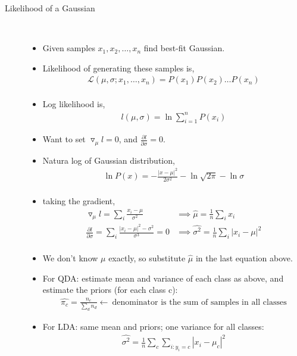 \documentclass[10pt]{article}
\begin{document}
\begin{description}
	\item[Likelihood of a Gaussian]
		\
		\begin{itemize}
			\item Given samples $x_{1}, x_{2}, \dots, x_{n}$ find best-fit Gaussian.
			\item Likelihood of generating these samples is,
				\begin{align*}
					\mathcal{L}(\mu, \sigma;x_{1}, \dots, x_{n}) = P(x_{1})P(x_{2}) \dots P(x_{n})\\
				\end{align*}
			\item Log likelihood is,
				\begin{align*}
					l(\mu, \sigma) = \ln \sum_{i=1}^{n} P(x_{i})
				\end{align*}
			\item Want to set $\triangledown_{\mu} l = 0$, and  $\frac{\partial l}{\partial \sigma} = 0$.
			\item Natura log of Gaussian distribution,
				\begin{align*}
					\ln P(x) = -\frac{|x-\mu|^{2}}{2\sigma^{2}} - \ln \sqrt{2\pi} - \ln \sigma\\
				\end{align*}
			\item taking the gradient,
				\begin{align*}
					\triangledown_{\mu}l = \sum_{i} \frac{x_{i}-\mu}{\sigma^{2}} &\implies \hat{\mu} = \frac{1}{n} \sum_{i} x_{i}\\
					\frac{\partial l}{\partial \sigma} = \sum_{i} \frac{|x_{i} - \mu|^{2} - \sigma^{2}}{\sigma^{3}} = 0 &\implies \hat{\sigma^{2}} = \frac{1}{n} \sum_{i} |x_{i} - \mu|^{2}\\
				\end{align*}
			\item We don't know $\mu$ exactly, so substitute $\hat{\mu}$ in the last equation above.
			\item For QDA: estimate mean and variance of each class as above, and estimate the priors (for each class c):
				\begin{align*}
					\hat{\pi_{c}} = \frac{n_{c}}{\sum_{d} n_{d}} \leftarrow \ \text{denominator is the sum of samples in all classes}
				\end{align*}
			\item For LDA: same mean and priors; one variance for all classes:
				\begin{align*}
					\hat{\sigma^{2}} = \frac{1}{n} \sum_{c} \sum_{i:y_{i}=c} |x_{i} - \mu_{c}|^{2}
				\end{align*}
		\end{itemize}
\end{description}
\end{document}
